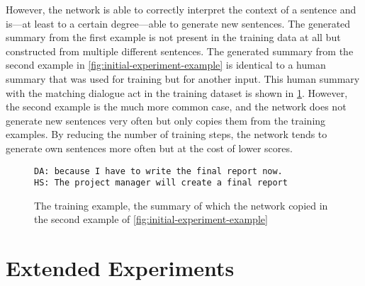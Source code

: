 However, the network is able to correctly interpret the context of a sentence and is---at least to a certain degree---able to generate new sentences.
The generated summary from the first example is not present in the training data at all but constructed from multiple different sentences.
The generated summary from the second example in \cref{fig:initial-experiment-example} is identical to a human summary that was used for training but for another input.
This human summary with the matching dialogue act in the training dataset is shown in \cref{fig:initial-experiment-training-example}.
However, the second example is the much more common case, and the network does not generate new sentences very often but only copies them from the training examples.
By reducing the number of training steps, the network tends to generate own sentences more often but at the cost of lower scores.

\begin{figure}[h]
\begin{lstlisting}[numbers=none]
DA: because I have to write the final report now.
HS: The project manager will create a final report
\end{lstlisting}
\caption{The training example, the summary of which the network copied in the second example of \cref{fig:initial-experiment-example}}
\label{fig:initial-experiment-training-example}
\end{figure}


\section{Extended Experiments}

